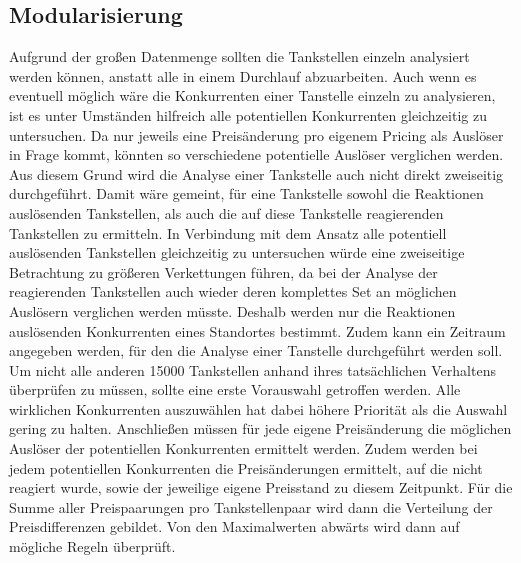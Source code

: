 \documentclass[12pt,a4paper,bibliography=totocnumbered,listof=totocnumbered]{scrartcl}
\begin{document}
\subsection{Modularisierung}
Aufgrund der großen Datenmenge sollten die Tankstellen einzeln analysiert werden können, anstatt alle in einem Durchlauf abzuarbeiten. Auch wenn es eventuell möglich wäre die Konkurrenten einer Tanstelle einzeln zu analysieren, ist es unter Umständen hilfreich alle potentiellen Konkurrenten gleichzeitig zu untersuchen. Da nur jeweils eine Preisänderung pro eigenem Pricing als Auslöser in Frage kommt, könnten so verschiedene potentielle Auslöser verglichen werden. Aus diesem Grund wird die Analyse einer Tankstelle auch nicht direkt zweiseitig durchgeführt. Damit wäre gemeint, für eine Tankstelle sowohl die Reaktionen auslösenden Tankstellen, als auch die auf diese Tankstelle reagierenden Tankstellen zu ermitteln. In Verbindung mit dem Ansatz alle potentiell auslösenden Tankstellen gleichzeitig zu untersuchen würde eine zweiseitige Betrachtung zu größeren Verkettungen führen, da bei der Analyse der reagierenden Tankstellen auch wieder deren komplettes Set an möglichen Auslösern verglichen werden müsste. Deshalb werden nur die Reaktionen auslösenden Konkurrenten eines Standortes bestimmt. Zudem kann ein Zeitraum angegeben werden, für den die Analyse einer Tanstelle durchgeführt werden soll.\\
Um nicht alle anderen 15000 Tankstellen anhand ihres tatsächlichen Verhaltens überprüfen zu müssen, sollte eine erste Vorauswahl getroffen werden. Alle wirklichen Konkurrenten auszuwählen hat dabei höhere Priorität als die Auswahl gering zu halten. Anschließen müssen für jede eigene Preisänderung die möglichen Auslöser der potentiellen Konkurrenten ermittelt werden. Zudem werden bei jedem potentiellen Konkurrenten die Preisänderungen ermittelt, auf die nicht reagiert wurde, sowie der jeweilige eigene Preisstand zu diesem Zeitpunkt. Für die Summe aller Preispaarungen pro Tankstellenpaar wird dann die Verteilung der Preisdifferenzen gebildet. Von den Maximalwerten abwärts wird dann auf mögliche Regeln überprüft.


\pagebreak

\end{document}
